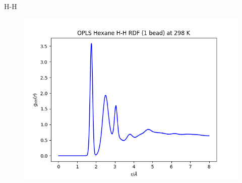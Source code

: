 \documentclass[12pt,reqno]{amsart}
\numberwithin{equation}{section}
\begin{document}
\begin{enumerate}
H-H
\begin{figure}[H]
\centering
\includegraphics[scale=0.6]{H_H-1bead-bonded-OPLS-hexane-298-bin01}
\end{figure}

\end{enumerate}
\end{document}
